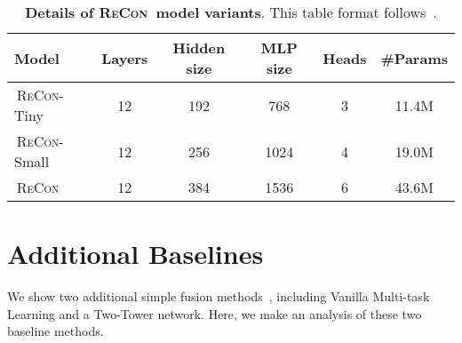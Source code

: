 \documentclass{article}
\theoremstyle{plain}
\theoremstyle{definition}
\theoremstyle{remark}
\def\recon{{\scshape ReCon}}
\newcommand{\reconcolor}[1]{\textcolor{reconcolor}{#1}}
\newcommand{\vitcolor}[1]{\textcolor{vitcolor}{#1}}
\newcommand{\br}{\reconcolor{\,}} \newcommand{\bv}{\vitcolor{\,}}  \newcommand{\bs}{\vitcolor{\,}} \newcommand{\bh}{\reconcolor{\,}}
\begin{document}
\begin{table}[!t]
\caption{\textbf{Details of \recon\ model variants}. This table format follows~\citet{ViT}.} \label{tab:recon_variants}
\begin{center}
\begin{tabular}{lccccc}
\toprule[0.95pt]
Model & Layers & Hidden size & MLP size & Heads & \#Params\\
\midrule[0.6pt]
\br\recon-Tiny & 12 & 192 & 768 & 3 & 11.4M\\
\br\recon-Small & 12 & 256 & 1024 & 4 & 19.0M\\
\br\recon & 12 & 384 & 1536 & 6 & 43.6M \\
\bottomrule[0.95pt]
\end{tabular}
\end{center}
\vspace{-25pt}
\end{table} 

\section{Additional Baselines}\label{app:add_baseline}
We show two additional simple fusion methods~\citep{MTLOverview}, including Vanilla Multi-task Learning and a Two-Tower network. Here, we make an analysis of these two baseline methods.
\end{document}
